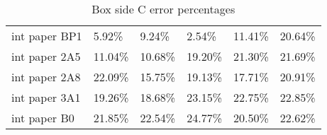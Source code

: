 \documentclass[11pt, twoside, reqno]{book}
\begin{document}
\begin{table}[]
\begin{tabular}{llllll}
		int paper BP1       & 5.92\%           & 9.24\%           & 2.54\%           & 11.41\%          & 20.64\%          \\
		int paper 2A5       & 11.04\%          & 10.68\%          & 19.20\%          & 21.30\%          & 21.69\%          \\
		int paper 2A8       & 22.09\%          & 15.75\%          & 19.13\%          & 17.71\%          & 20.91\%          \\
		int paper 3A1       & 19.26\%          & 18.68\%          & 23.15\%          & 22.75\%          & 22.85\%          \\
		int paper B0        & 21.85\%          & 22.54\%          & 24.77\%          & 20.50\%          & 22.62\%         
	\end{tabular}
\caption{Box side C error percentages}
\end{table}
\end{document}
